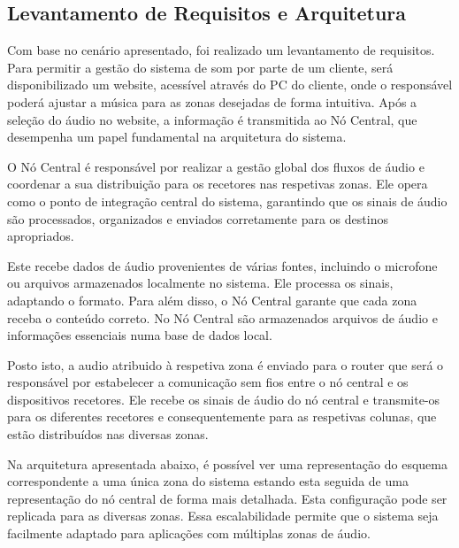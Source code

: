 \documentclass{article}
\begin{document}
\newpage


\hspace{5cm}
\subsection{Levantamento de Requisitos e Arquitetura} 

\hspace{2cm}

Com base no cenário apresentado, foi realizado um levantamento de requisitos. Para permitir a gestão do sistema de som por parte de um cliente, será disponibilizado um website, acessível através do PC do cliente, onde o responsável poderá ajustar a música para as zonas desejadas de forma intuitiva. Após a seleção do áudio no website, a informação é transmitida ao Nó Central, que desempenha um papel fundamental na arquitetura do sistema. 


\hspace{0.5cm}

O Nó Central é responsável por realizar a gestão global dos fluxos de áudio e coordenar a sua distribuição para os recetores nas respetivas zonas. Ele opera como o ponto de integração central do sistema, garantindo que os sinais de áudio são processados, organizados e enviados corretamente para os destinos apropriados.



Este recebe dados de áudio provenientes de várias fontes, incluindo o microfone ou arquivos armazenados localmente no sistema. Ele processa os sinais, adaptando o formato. Para além disso, o Nó Central garante que cada zona receba o conteúdo correto. No Nó Central são armazenados arquivos de áudio e informações essenciais numa base de dados local.


\hspace{0.5cm}

Posto isto, a audio atribuido à respetiva zona é enviado para o router que será o responsável
por estabelecer a comunicação sem fios entre o nó central e os dispositivos recetores. Ele recebe os sinais de áudio do nó central e transmite-os para os diferentes recetores e consequentemente para as respetivas colunas, que estão distribuídos nas diversas zonas. 



\hspace{5cm}



Na arquitetura apresentada abaixo, é possível ver uma representação do esquema correspondente a uma única zona do sistema estando esta seguida de uma representação do nó central de forma mais detalhada. Esta configuração pode ser replicada para as diversas zonas. Essa escalabilidade permite que o sistema seja facilmente adaptado para aplicações com múltiplas zonas de áudio.
\end{document}

